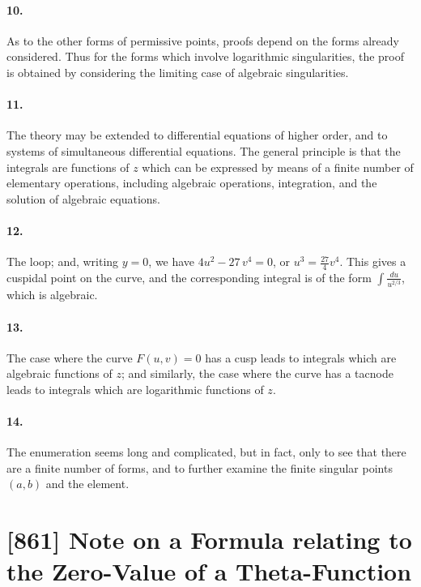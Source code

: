 \documentclass[11pt,a4paper]{article}
\theoremstyle{definition}
\begin{document}
\paragraph{10.} As to the other forms of permissive points, proofs depend on the forms already considered. Thus for the forms which involve logarithmic singularities, the proof is obtained by considering the limiting case of algebraic singularities.

\paragraph{11.} The theory may be extended to differential equations of higher order, and to systems of simultaneous differential equations. The general principle is that the integrals are functions of $z$ which can be expressed by means of a finite number of elementary operations, including algebraic operations, integration, and the solution of algebraic equations.

\paragraph{12.} The loop; and, writing $y = 0$, we have $4u^{2} - 27\,v^{4} = 0$, or $u^{3} = \frac{27}{4}v^{4}$. This gives a cuspidal point on the curve, and the corresponding integral is of the form $\int \frac{du}{u^{2/3}}$, which is algebraic.

\paragraph{13.} The case where the curve $F(u, v) = 0$ has a cusp leads to integrals which are algebraic functions of $z$; and similarly, the case where the curve has a tacnode leads to integrals which are logarithmic functions of $z$.

\paragraph{14.} The enumeration seems long and complicated, but in fact, only to see that there are a finite number of forms, and to further examine the finite singular points $(a, b)$ and the element.

\newpage
\section*{[861] Note on a Formula relating to the Zero-Value of a Theta-Function}
\end{document}
